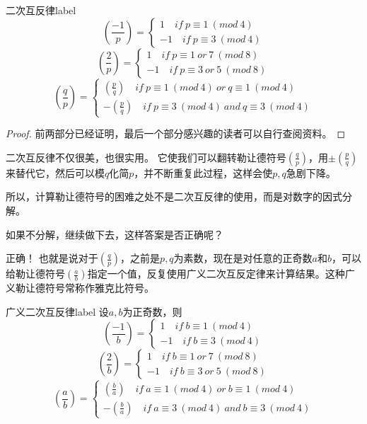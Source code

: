 \begin{theorem}{二次互反律}{label}
$$
\left(  \frac{-1}{p}  \right)= \left\{\begin{matrix}
1   \quad if\ p\equiv 1 \ (mod \ 4) \\ 
-1 \quad if\ p\equiv 3 \ (mod \ 4)
\end{matrix}\right.
$$
$$
\left(  \frac{2}{p}  \right)= \left\{\begin{matrix}
1   \quad if\ p\equiv 1\ or\ 7 \ (mod \ 8) \\ 
-1 \quad if\ p\equiv 3\ or\ 5\ (mod \ 8)
\end{matrix}\right.
$$
$$
\left(\frac{q}{p}\right)=\left\{\begin{array}{c}{\left(\frac{p}{q}\right)}\quad if\ p\equiv1\ (mod\ 4)\ or\ q\equiv1\ (mod\ 4) \\ {-\left(\frac{p}{q}\right) \quad if\ p\equiv3\ (mod\ 4)\ and\ q\equiv3\ (mod\ 4) }\end{array}\right.
$$
\end{theorem}

\begin{proof}
前两部分已经证明，最后一个部分感兴趣的读者可以自行查阅资料。
\end{proof}

\vbox{}

二次互反律不仅很美，也很实用。
它使我们可以翻转勒让德符号$\left(\frac{q}{p}\right)$，用$\pm \left(\frac{p}{q}\right)$来替代它，然后可以模$q$化简$p$，并不断重复此过程，这样会使$p,q$急剧下降。

所以，计算勒让德符号的困难之处不是二次互反律的使用，而是对数字的因式分解。

如果不分解，继续做下去，这样答案是否正确呢？

{\heiti 正确！} 也就是说对于$\left(\frac{q}{p}\right)$，之前是$p,q$为素数，现在是对任意的正奇数$a$和$b$，可以给勒让德符号$\left(\frac{a}{b}\right)$指定一个值，反复使用广义二次互反定律来计算结果。这种广义勒让德符号常称作{\heiti 雅克比符号}。

\begin{theorem}{广义二次互反律}{label}
设$a,b$为正奇数，则
$$
\left(  \frac{-1}{b}  \right)= \left\{\begin{matrix}
1   \quad if\ b\equiv 1 \ (mod \ 4) \\ 
-1 \quad if\ b\equiv 3 \ (mod \ 4)
\end{matrix}\right.
$$
$$
\left(  \frac{2}{b}  \right)= \left\{\begin{matrix}
1   \quad if\ b\equiv 1\ or\ 7 \ (mod \ 8) \\ 
-1 \quad if\ b\equiv 3\ or\ 5\ (mod \ 8)
\end{matrix}\right.
$$
$$
\left(\frac{a}{b}\right)=\left\{\begin{array}{c}{\left(\frac{b}{a}\right)}\quad if\ a\equiv1\ (mod\ 4)\ or\ b\equiv1\ (mod\ 4) \\ {-\left(\frac{b}{a}\right) \quad if\ a\equiv3\ (mod\ 4)\ and\ b\equiv3\ (mod\ 4) }\end{array}\right.
$$
\end{theorem}

